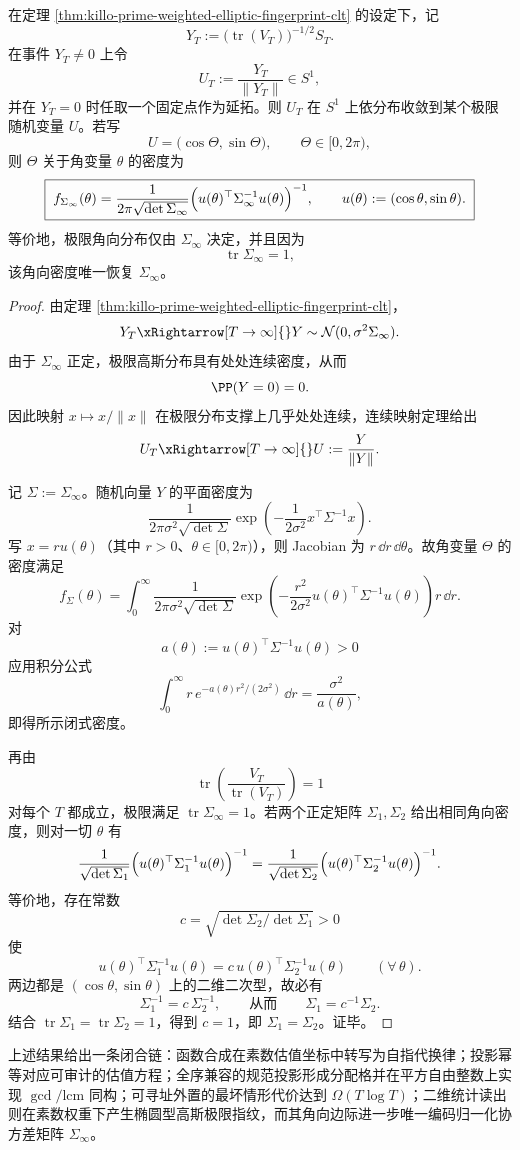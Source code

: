 \begin{corollary}\label{cor:killo-prime-weighted-angular-law-sigma-recovery}
在定理 \ref{thm:killo-prime-weighted-elliptic-fingerprint-clt} 的设定下，记
\[
Y_T:=\bigl(\operatorname{tr}(V_T)\bigr)^{-1/2}S_T.
\]
在事件 \(Y_T\neq 0\) 上令
\[
U_T:=\frac{Y_T}{\|Y_T\|}\in S^1,
\]
并在 \(Y_T=0\) 时任取一个固定点作为延拓。则 \(U_T\) 在 \(S^1\) 上依分布收敛到某个极限随机变量 \(U\)。若写
\[
U=\bigl(\cos\Theta,\sin\Theta\bigr),\qquad \Theta\in[0,2\pi),
\]
则 \(\Theta\) 关于角变量 \(\theta\) 的密度为
\[
\boxed{\;
f_{\Sigma_\infty}(\theta)=
\frac{1}{2\pi\sqrt{\det\Sigma_\infty}}
\Bigl(u(\theta)^\top\Sigma_\infty^{-1}u(\theta)\Bigr)^{-1},
\qquad
u(\theta):=(\cos\theta,\sin\theta).
\;}
\]
等价地，极限角向分布仅由 \(\Sigma_\infty\) 决定，并且因为
\[
\operatorname{tr}\Sigma_\infty=1,
\]
该角向密度唯一恢复 \(\Sigma_\infty\)。
\end{corollary}
\begin{proof}
由定理 \ref{thm:killo-prime-weighted-elliptic-fingerprint-clt}，
\[
Y_T\xRightarrow[T\to\infty]{}Y\sim \mathcal N(0,\sigma^2\Sigma_\infty).
\]
由于 \(\Sigma_\infty\) 正定，极限高斯分布具有处处连续密度，从而
\[
\PP(Y=0)=0.
\]
因此映射 \(x\mapsto x/\|x\|\) 在极限分布支撑上几乎处处连续，连续映射定理给出
\[
U_T\xRightarrow[T\to\infty]{}U:=\frac{Y}{\|Y\|}.
\]

记 \(\Sigma:=\Sigma_\infty\)。随机向量 \(Y\) 的平面密度为
\[
\frac{1}{2\pi\sigma^2\sqrt{\det\Sigma}}
\exp\!\left(-\frac{1}{2\sigma^2}x^\top\Sigma^{-1}x\right).
\]
写 \(x=ru(\theta)\)（其中 \(r>0\)、\(\theta\in[0,2\pi)\)），则 Jacobian 为 \(r\,\dd r\,\dd\theta\)。故角变量 \(\Theta\) 的密度满足
\[
f_\Sigma(\theta)
=
\int_0^\infty
\frac{1}{2\pi\sigma^2\sqrt{\det\Sigma}}
\exp\!\left(
-\frac{r^2}{2\sigma^2}u(\theta)^\top\Sigma^{-1}u(\theta)
\right)
r\,\dd r.
\]
对
\[
a(\theta):=u(\theta)^\top\Sigma^{-1}u(\theta)>0
\]
应用积分公式
\[
\int_0^\infty r\,e^{-a(\theta)r^2/(2\sigma^2)}\,\dd r
=\frac{\sigma^2}{a(\theta)},
\]
即得所示闭式密度。

再由
\[
\operatorname{tr}\!\left(\frac{V_T}{\operatorname{tr}(V_T)}\right)=1
\]
对每个 \(T\) 都成立，极限满足 \(\operatorname{tr}\Sigma_\infty=1\)。若两个正定矩阵 \(\Sigma_1,\Sigma_2\) 给出相同角向密度，则对一切 \(\theta\) 有
\[
\frac{1}{\sqrt{\det\Sigma_1}}
\Bigl(u(\theta)^\top\Sigma_1^{-1}u(\theta)\Bigr)^{-1}
=
\frac{1}{\sqrt{\det\Sigma_2}}
\Bigl(u(\theta)^\top\Sigma_2^{-1}u(\theta)\Bigr)^{-1}.
\]
等价地，存在常数
\[
c=\sqrt{\det\Sigma_2/\det\Sigma_1}>0
\]
使
\[
u(\theta)^\top\Sigma_1^{-1}u(\theta)
=
c\,u(\theta)^\top\Sigma_2^{-1}u(\theta)
\qquad
(\forall\,\theta).
\]
两边都是 \((\cos\theta,\sin\theta)\) 上的二维二次型，故必有
\[
\Sigma_1^{-1}=c\,\Sigma_2^{-1},
\qquad\text{从而}\qquad
\Sigma_1=c^{-1}\Sigma_2.
\]
结合 \(\operatorname{tr}\Sigma_1=\operatorname{tr}\Sigma_2=1\)，得到 \(c=1\)，即 \(\Sigma_1=\Sigma_2\)。证毕。
\end{proof}

上述结果给出一条闭合链：函数合成在素数估值坐标中转写为自指代换律；投影幂等对应可审计的估值方程；全序兼容的规范投影形成分配格并在平方自由整数上实现 \(\gcd/\mathrm{lcm}\) 同构；可寻址外置的最坏情形代价达到 \(\Omega(T\log T)\)；二维统计读出则在素数权重下产生椭圆型高斯极限指纹，而其角向边际进一步唯一编码归一化协方差矩阵 \(\Sigma_\infty\)。
